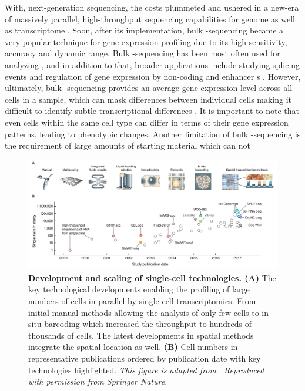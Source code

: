 \par With, next-generation sequencing, the costs plummeted and ushered in a new-era of massively parallel, high-throughput sequencing capabilities for genome as well as transcriptome \textbf{\cite{voelkerding_next-generation_2009}}. Soon, after its implementation, bulk -sequencing became a very popular technique for gene expression profiling due to its high sensitivity, accuracy and dynamic range. Bulk -sequencing has been most often used for analyzing , and in addition to that, broader applications include studying splicing events and regulation of gene expression by non-coding and enhancer s \textbf{\cite{stark_rna_2019}}. However, ultimately, bulk -sequencing provides an average gene expression level across all cells in a sample, which can mask differences between individual cells making it difficult to identify subtle transcriptional differences \textbf{\cite{kalisky_brief_2018}}. It is important to note that even cells within the same cell type can differ in terms of their gene expression patterns, leading to phenotypic changes. Another limitation of bulk -sequencing is the requirement of large amounts of starting material which can not 


\begin{figure}[t]
    \centering
    \includegraphics[width=\linewidth]{Chapter1/Fig/F1-5-02.png}
    \caption[Development and scaling of single-cell technologies]{\textbf{Development and scaling of single-cell technologies. (A)} The key technological developments enabling the profiling of large numbers of cells in parallel by single-cell transcriptomics. From initial manual methods allowing the analysis of only few cells to in situ barcoding which increased the throughput to hundreds of thousands of cells. The latest developments in spatial methods integrate the spatial location as well. \textbf{(B)} Cell numbers in representative publications ordered by publication date with key technologies highlighted. \textit{This figure is adapted from} \textbf{\cite{aldridge_single_2020,svensson_exponential_2018}}.\textit{ Reproduced with permission from Springer Nature.}}
    \label{fig:chp1_scrna-1}
\end{figure}

